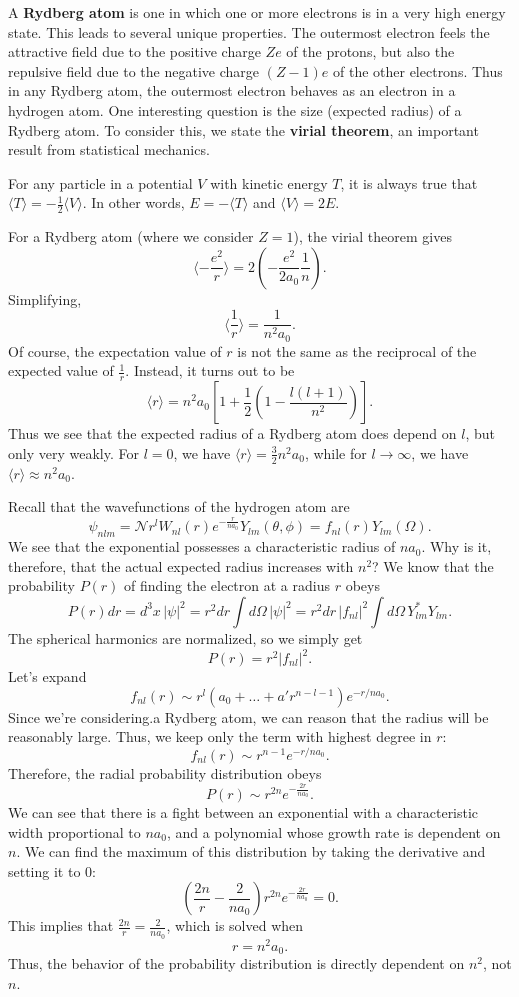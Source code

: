 A \textbf{Rydberg atom} is one in which one or more electrons is in a very high energy state. This leads to several unique properties. The outermost electron feels the attractive field due to the positive charge $Ze$ of the protons, but also the repulsive field due to the negative charge $(Z-1)e$ of the other electrons. Thus in any Rydberg atom, the outermost electron behaves as an electron in a hydrogen atom. One interesting question is the size (expected radius) of a Rydberg atom. To consider this, we state the \textbf{virial theorem}, an important result from statistical mechanics.

\begin{framedthm}
    For any particle in a potential $V$ with kinetic energy $T$, it is always true that $\langle T\rangle = -\frac{1}{2}\langle V\rangle$. In other words, $E=-\langle T\rangle$ and $\langle V\rangle=2E$.
\end{framedthm}

For a Rydberg atom (where we consider $Z=1$), the virial theorem gives $$\langle -\frac{e^2}{r}\rangle=2(-\frac{e^2}{2a_0}\frac{1}{n}).$$Simplifying, $$\langle\frac{1}{r}\rangle=\frac{1}{n^2 a_0}.$$Of course, the expectation value of $r$ is not the same as the reciprocal of the expected value of $\frac{1}{r}$. Instead, it turns out to be $$\langle r\rangle= n^2a_0[1+\frac{1}{2}(1-\frac{l(l+1)}{n^2})].$$Thus we see that the expected radius of a Rydberg atom does depend on $l$, but only very weakly. For $l=0$, we have $\langle r\rangle=\frac{3}{2}n^2a_0$, while for $l\to\infty$, we have $\langle r\rangle\approx n^2a_0$. 

Recall that the wavefunctions of the hydrogen atom are $$\psi_{nlm} = \mathcal{N}r^l W_{nl}(r)e^{-\frac{r}{na_0}}Y_{lm}(\theta,\phi)=f_{nl}(r)Y_{lm}(\Omega).$$We see that the exponential possesses a characteristic radius of $na_0$. Why is it, therefore, that the actual expected radius increases with $n^2$? We know that the probability $P(r)$ of finding the electron at a radius $r$ obeys $$P(r)dr=d^3x\,|\psi|^2=r^2dr\int d\Omega\,|\psi|^2=r^2dr\,|f_{nl}|^2\int d\Omega\,Y_{lm}^*Y_{lm}.$$The spherical harmonics are normalized, so we simply get $$P(r)=r^2|f_{nl}|^2.$$Let's expand $$f_{nl}(r)\sim r^l(a_0+\ldots+a'r^{n-l-1})e^{-r/na_0}.$$Since we're considering.a Rydberg atom, we can reason that the radius will be reasonably large. Thus, we keep only the term with highest degree in $r$: $$f_{nl}(r)\sim r^{n-1}e^{-r/na_0}.$$Therefore, the radial probability distribution obeys$$P(r)\sim r^{2n}e^{-\frac{2r}{na_0}}.$$We can see that there is a fight between an exponential with a characteristic width proportional to $na_0$, and a polynomial whose growth rate is dependent on $n$. We can find the maximum of this distribution by taking the derivative and setting it to $0$: $$(\frac{2n}{r}-\frac{2}{na_0})r^{2n}e^{-\frac{2r}{na_0}}=0.$$This implies that $\frac{2n}{r}=\frac{2}{na_0}$, which is solved when $$r=n^2a_0.$$Thus, the behavior of the probability distribution is directly dependent on $n^2$, not $n$. 

